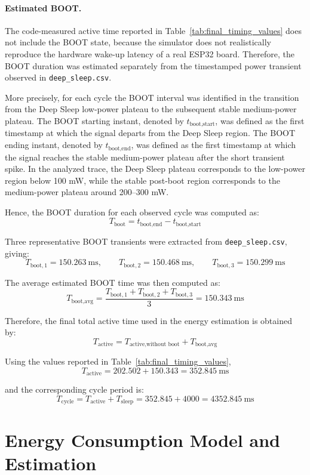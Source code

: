 \documentclass{article}
\begin{document}
\paragraph{Estimated BOOT.}
The code-measured active time reported in Table~\ref{tab:final_timing_values} does not include the BOOT state, because the simulator does not realistically reproduce the hardware wake-up latency of a real ESP32 board. Therefore, the BOOT duration was estimated separately from the timestamped power transient observed in \texttt{deep\_sleep.csv}.

More precisely, for each cycle the BOOT interval was identified in the transition from the Deep Sleep low-power plateau to the subsequent stable medium-power plateau. The BOOT starting instant, denoted by \(t_{\text{boot,start}}\), was defined as the first timestamp at which the signal departs from the Deep Sleep region. The BOOT ending instant, denoted by \(t_{\text{boot,end}}\), was defined as the first timestamp at which the signal reaches the stable medium-power plateau after the short transient spike. In the analyzed trace, the Deep Sleep plateau corresponds to the low-power region below 100 mW, while the stable post-boot region corresponds to the medium-power plateau around 200--300 mW.

Hence, the BOOT duration for each observed cycle was computed as:
\[
T_{\text{boot}} = t_{\text{boot,end}} - t_{\text{boot,start}}
\]

Three representative BOOT transients were extracted from \texttt{deep\_sleep.csv}, giving:
\[
T_{\text{boot},1}=150.263\ \text{ms},\qquad
T_{\text{boot},2}=150.468\ \text{ms},\qquad
T_{\text{boot},3}=150.299\ \text{ms}
\]

The average estimated BOOT time was then computed as:
\[
T_{\text{boot,avg}}=
\frac{T_{\text{boot},1}+T_{\text{boot},2}+T_{\text{boot},3}}{3}
=150.343\ \text{ms}
\]

Therefore, the final total active time used in the energy estimation is obtained by:
\[
T_{\text{active}}=
T_{\text{active,without boot}}+T_{\text{boot,avg}}
\]

Using the values reported in Table~\ref{tab:final_timing_values},
\[
T_{\text{active}}=202.502+150.343=352.845\ \text{ms}
\]

and the corresponding cycle period is:
\[
T_{\text{cycle}} = T_{\text{active}} + T_{\text{sleep}}
=352.845+4000=4352.845\ \text{ms}
\]

\section{Energy Consumption Model and Estimation}
\end{document}
